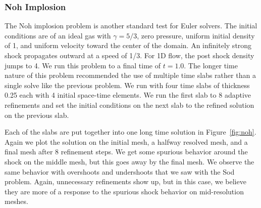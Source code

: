 \documentclass[preprint,12pt]{elsarticle}
\begin{document}
\subsubsection{Noh Implosion}
The Noh implosion problem\cite{Noh1987} is another standard test for Euler solvers.
The initial conditions are of an ideal gas with $\gamma=5/3$, zero pressure, uniform initial density of 1, 
and uniform velocity toward the center of the domain.
An infinitely strong shock propagates outward at a speed of 1/3.
For 1D flow, the post shock density jumps to 4.
We run this problem to a final time of $t=1.0$.
The longer time nature of this problem recommended the use of multiple time slabs rather than a single solve like the previous problem.
We run with four time slabs of thickness 0.25 each with 4 initial space-time elements.
We run the first slab to 8 adaptive refinements and set the initial conditions on the next slab to the refined solution on the previous slab.

Each of the slabs are put together into one long time solution in Figure~\ref{fig:noh}. 
Again we plot the solution on the initial mesh, a halfway resolved mesh, and a final mesh after 8 refinement steps.
We get some spurious behavior around the shock on the middle mesh, but this goes away by the final mesh.
We observe the same behavior with overshoots and undershoots that we saw with the Sod problem. 
Again, unnecessary refinements show up, but in this case, we believe they are more of a response to the spurious shock behavior on mid-resolution meshes.
\end{document}
